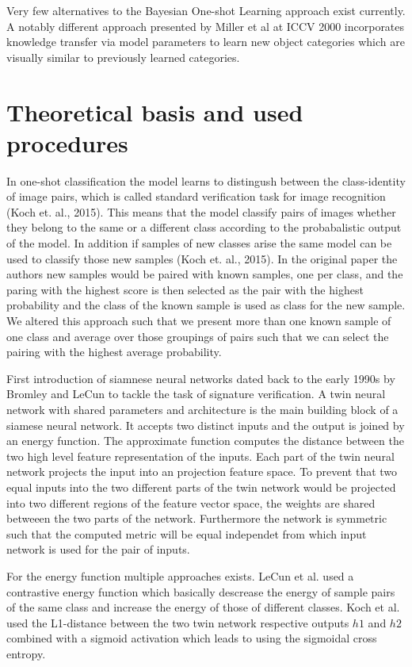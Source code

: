 \documentclass[a4paper,pt12]{article}
\begin{document}
Very few alternatives to the Bayesian One-shot Learning approach exist currently. A notably different approach presented by Miller et al at ICCV 2000 incorporates knowledge transfer via model parameters to learn new object categories which are visually similar to previously learned categories.

\section{Theoretical basis and used procedures}
In one-shot classification the model learns to distingush between the class-identity of image pairs, which is called standard verification task for image recognition (Koch et. al., 2015). This means that the model classify pairs of images whether they belong to the same or a different class according to the probabalistic output of the model. In addition if samples of new classes arise the same model can be used to classify those new samples (Koch et. al., 2015). In the original paper the authors new samples would be paired with known samples, one per class, and the paring with the highest score is then selected as the pair with the highest probability and the class of the known sample is used as class for the new sample. We altered this approach such that we present more than one known sample of one class and average over those groupings of pairs such that we can select the pairing with the highest average probability.

First introduction of siamnese neural networks dated back to the early 1990s by Bromley and LeCun to tackle the task of signature verification. A twin neural network with shared parameters and architecture is the main building block of a siamese neural network. It accepts two distinct inputs and the output is joined by an energy function. The approximate function computes the distance between the two high level feature representation of the inputs. Each part of the twin neural network projects the input into an projection feature space. To prevent that two equal inputs into the two different parts of the twin network would be projected into two different regions of the feature vector space, the weights are shared betweeen the two parts of the network. Furthermore the network is symmetric such that the computed metric will be equal independet from which input network is used for the pair of inputs.

For the energy function multiple approaches exists. LeCun et al. used a contrastive energy function which basically descrease the energy of sample pairs of the same class and increase the energy of those of different classes. Koch et al. used the L1-distance between the two twin network respective outputs $h1$ and $h2$ combined with a sigmoid activation which leads to using the sigmoidal cross entropy.
\end{document}
